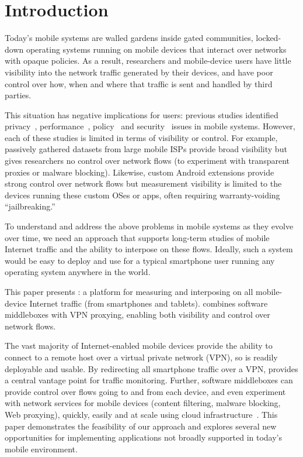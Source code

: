 \section{Introduction}
\label{sec:introduction}

Today's mobile systems are walled gardens inside gated communities, \ie{} locked-down operating systems 
running on mobile devices that interact over networks with opaque policies. As a result, 
researchers and mobile-device users have little visibility into the network traffic generated by 
their devices, and have poor control over how, when and where that traffic is sent and handled by third parties. 

This situation has negative implications for users: previous studies  
identified privacy~\cite{vallina-rod:ads}, performance~\cite{gerber:passivespeed,chen:wifi,sommers:cellwifi}, policy~\cite{wang:middleboxes} and security~\cite{enck:taintdroid} issues in mobile systems. However, each of these studies 
is limited in terms of visibility or control. 
For example, passively gathered datasets from large mobile 
ISPs provide broad visibility but gives researchers no control over network flows (\eg to experiment with 
transparent proxies or malware blocking). Likewise, custom Android extensions provide 
strong control over network flows but measurement visibility is limited to the devices running these 
custom OSes or apps, often requiring warranty-voiding ``jailbreaking.'' 

To understand and address the above problems in mobile systems as they evolve over time, we 
need an approach that supports long-term studies of mobile Internet traffic and the ability to 
interpose on these flows. 
Ideally, such a system would be easy to deploy and use for a typical smartphone user 
running any operating system anywhere in the world.

This paper presents \meddle:  a platform for measuring and interposing on all mobile-device 
Internet traffic (\eg from smartphones and tablets). \meddle combines software middleboxes 
with VPN proxying, enabling both visibility and control over network flows. 

The vast majority of Internet-enabled mobile devices provide the ability to connect to a remote 
host over a virtual private network (VPN), so \meddle is readily deployable and usable. 
By redirecting all smartphone traffic over a VPN, \meddle provides a central vantage point for traffic monitoring.
Further, software middleboxes can provide control over flows going to and from each device, and even experiment 
with network services for mobile devices (\eg content filtering, malware blocking, Web proxying), quickly, easily and at scale using cloud infrastructure~\cite{sherry:middleboxes}. 
This paper demonstrates the feasibility of our approach and explores several new opportunities 
for implementing applications not broadly supported in today's mobile 
environment. 

